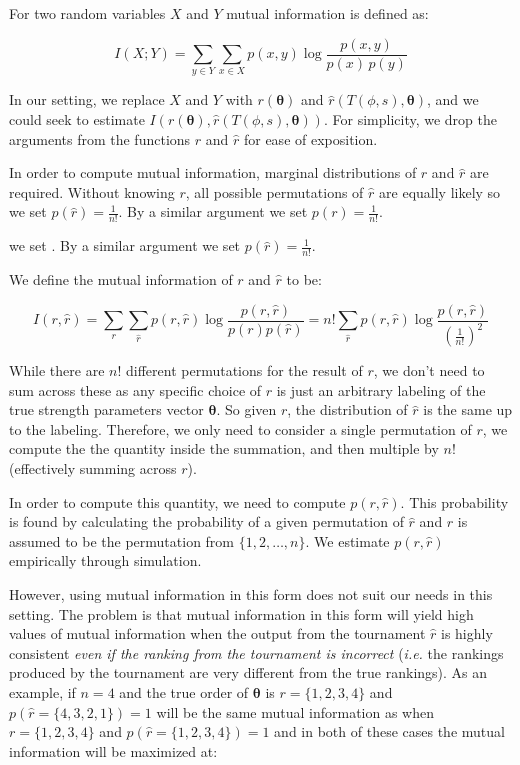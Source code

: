 \documentclass[
  12pt,
]{article}
\begin{document}
For two random variables \(X\) and \(Y\) mutual information is defined
as:

\[
I(X;Y)=\sum_{y\in Y}\sum_{x\in X}p(x,y)\log \frac {p(x,y)}{p(x)\,p(y)}
\]

In our setting, we replace \(X\) and \(Y\) with
\(r(\boldsymbol{\theta})\) and
\(\hat{r}(T(\phi, s),\boldsymbol{\theta})\), and we could seek to
estimate
\(I(r(\boldsymbol{\theta}),\hat{r}(T(\phi, s),\boldsymbol{\theta}))\).
For simplicity, we drop the arguments from the functions \(r\) and
\(\hat{r}\) for ease of exposition.

In order to compute mutual information, marginal distributions of \(r\)
and \(\hat{r}\) are required. Without knowing \(r\), all possible
permutations of \(\hat{r}\) are equally likely so we set
\(p(\hat{r}) = \frac{1}{n!}\). By a similar argument we set
\(p(r) = \frac{1}{n!}\).

we set . By a similar argument we set \(p(\hat{r}) = \frac{1}{n!}\).

We define the mutual information of \(r\) and \(\hat{r}\) to be:

\[
I(r,\hat{r})=\sum_{r}\sum_{\hat{r}}p(r,\hat{r})\log \frac {p(r,\hat{r})}{p(r)p(\hat{r})} = n!\sum_{\hat{r}}p(r,\hat{r})\log \frac {p(r,\hat{r})}{(\frac{1}{n!})^2}
\]

While there are \(n!\) different permutations for the result of \(r\),
we don't need to sum across these as any specific choice of \(r\) is
just an arbitrary labeling of the true strength parameters vector
\(\boldsymbol{\theta}\). So given \(r\), the distribution of \(\hat{r}\)
is the same up to the labeling. Therefore, we only need to consider a
single permutation of \(r\), we compute the the quantity inside the
summation, and then multiple by \(n!\) (effectively summing across
\(r\)).

In order to compute this quantity, we need to compute \(p(r,\hat{r})\).
This probability is found by calculating the probability of a given
permutation of \(\hat{r}\) and \(r\) is assumed to be the permutation
from \(\{1, 2, \ldots, n\}\). We estimate \(p(r,\hat{r})\) empirically
through simulation.

However, using mutual information in this form does not suit our needs
in this setting. The problem is that mutual information in this form
will yield high values of mutual information when the output from the
tournament \(\hat{r}\) is highly consistent \emph{even if the ranking
from the tournament is incorrect} (\emph{i.e.} the rankings produced by
the tournament are very different from the true rankings). As an
example, if \(n=4\) and the true order of \(\boldsymbol{\theta}\) is
\(r = \{1, 2, 3, 4\}\) and \(p(\hat{r} = \{4, 3, 2, 1\}) = 1\) will be
the same mutual information as when \(r = \{1, 2, 3, 4\}\) and
\(p(\hat{r} = \{1, 2, 3, 4\}) = 1\) and in both of these cases the
mutual information will be maximized at:
\end{document}
